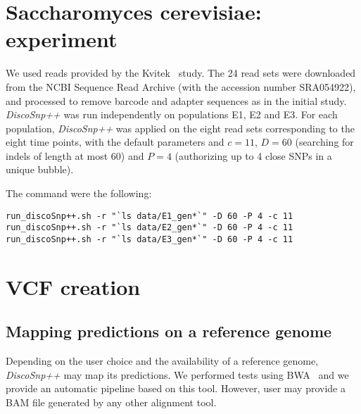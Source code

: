 \documentclass{bmcart}
\newcommand{\discopp}{{\it DiscoSnp++}\xspace}
\begin{document}
\section*{Saccharomyces cerevisiae: experiment}
We used reads provided by the Kvitek~\cite{Kvitek2013} study. The 24 read sets were downloaded from the NCBI Sequence Read Archive (with the accession number SRA054922), and processed to remove barcode and adapter sequences as in the initial study. \discopp was run independently on populations E1, E2
and E3. For each population, \discopp was applied on the eight read sets corresponding to the eight time points, with
the default parameters and $c=11$, $D=60$ (searching for indels of length at most 60) and $P=4$ (authorizing up to 4 close SNPs in a unique bubble).

The command were the following:

\scriptsize\begin{verbatim}
run_discoSnp++.sh -r "`ls data/E1_gen*`" -D 60 -P 4 -c 11
run_discoSnp++.sh -r "`ls data/E2_gen*`" -D 60 -P 4 -c 11
run_discoSnp++.sh -r "`ls data/E3_gen*`" -D 60 -P 4 -c 11
\end{verbatim}	\normalsize
\section{VCF creation} %
\subsection{Mapping predictions on a reference genome} %
Depending on the user choice and the availability of a reference genome, \discopp may map its predictions. We performed tests using BWA~\cite{bwa} and we provide an automatic pipeline based on this tool. However, user may provide a BAM file generated by any other alignment tool. 
\end{document}

